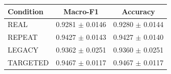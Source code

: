 \begin{tabular}{lcc}
\hline
Condition & Macro-F1 & Accuracy \\
\hline
REAL & 0.9281 $\pm$ 0.0146 & 0.9280 $\pm$ 0.0144 \\
REPEAT & 0.9427 $\pm$ 0.0143 & 0.9427 $\pm$ 0.0140 \\
LEGACY & 0.9362 $\pm$ 0.0251 & 0.9360 $\pm$ 0.0251 \\
TARGETED & 0.9467 $\pm$ 0.0117 & 0.9467 $\pm$ 0.0117 \\
\hline
\end{tabular}
